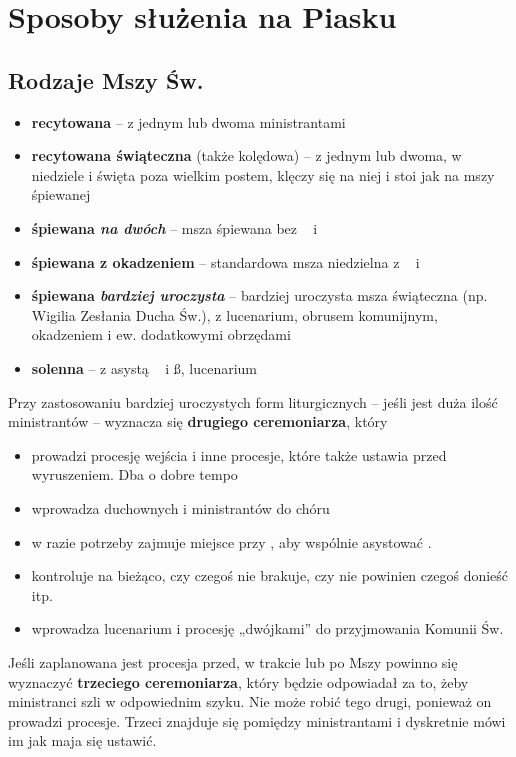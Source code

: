 
\section{Sposoby służenia na Piasku}

\subsection{Rodzaje Mszy Św.}

\begin{itemize}
	\item \textbf{recytowana} -- z jednym lub dwoma ministrantami
	\item \textbf{recytowana świąteczna} (także kolędowa) -- z jednym lub dwoma,
	      w niedziele i święta poza wielkim postem, klęczy się na niej i stoi
	      jak na mszy śpiewanej
	\item \textbf{śpiewana \textit{na dwóch}} -- msza śpiewana bez \cc~ i \tt~
	\item \textbf{śpiewana z okadzeniem} -- standardowa msza niedzielna z \cc~ i
	      \tt~
	\item \textbf{ śpiewana \textit{bardziej uroczysta}} -- bardziej uroczysta
	      msza świąteczna	(np. Wigilia Zesłania Ducha Św.), z lucenarium,
	      obrusem komunijnym, okadzeniem i ew. dodatkowymi obrzędami
	\item \textbf{solenna} -- z asystą \dd~ i \ss, lucenarium
\end{itemize}

\noindent Przy zastosowaniu bardziej uroczystych form liturgicznych -- jeśli
jest duża ilość ministrantów -- wyznacza się \textbf{drugiego ceremoniarza}, który
\begin{itemize}
	\item prowadzi procesję wejścia i inne procesje, które także ustawia przed
	      wyruszeniem. Dba o dobre tempo
	\item wprowadza duchownych i ministrantów do chóru
	\item w razie potrzeby zajmuje miejsce przy , aby wspólnie asystować
	      \ii.
	\item kontroluje na bieżąco, czy czegoś nie brakuje, czy nie powinien czegoś
	      donieść itp.
	\item wprowadza lucenarium i procesję „dwójkami” do przyjmowania Komunii Św.
\end{itemize}

\noindent Jeśli zaplanowana jest procesja przed, w trakcie lub po Mszy powinno
się wyznaczyć \textbf{trzeciego ceremoniarza}, który będzie odpowiadał za to,
żeby ministranci szli w odpowiednim szyku. Nie może robić tego drugi, ponieważ
on prowadzi procesje. Trzeci znajduje się pomiędzy ministrantami i dyskretnie
mówi im jak maja się ustawić.
